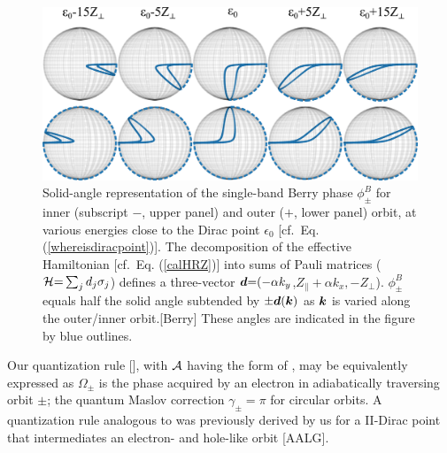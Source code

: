 \documentclass[aps, prb, showpacs, twocolumn, notitlepage, superscriptaddress]{revtex4-1}
\begin{document}
\begin{figure}
\includegraphics[width=1.0\columnwidth]{blochsphere.png}
\caption{Solid-angle representation of  the single-band Berry phase $\phi_{\pm}^B$ for inner (subscript $-$, upper panel) and outer ($+$, lower panel) orbit, at various energies close to the Dirac point $\epsilon_0$ [cf.\ Eq. (\ref{whereisdiracpoint})]. The decomposition of the effective Hamiltonian [cf.\ Eq. (\ref{calHRZ})] into sums of Pauli matrices (${\cal H}{=}\sum_jd_j\sigma_j$) defines a three-vector $\boldsymbol{d}{=}({-}\alpha k_y$,$Z_\parallel{+}\alpha k_x,{-}Z_\perp$).
 $\phi_{\pm}^B$  equals half the solid angle subtended by   ${\pm} \boldsymbol{d}(\boldsymbol{k})$ as $\boldsymbol{k}$ is varied along the outer/inner orbit.[Berry]   These angles are indicated in the figure by blue outlines.\label{fig:blochsphere}}
\end{figure}

Our quantization rule [], with ${\cal A}$ having the form of , may be equivalently expressed as
$\Omega_{\pm}$ is the phase acquired by an electron in adiabatically traversing orbit $\pm$; the quantum Maslov correction $\gamma_{\pm}{=}\pi$ for circular orbits.  A quantization rule analogous to  was previously derived by us for a II-Dirac point that intermediates an electron- and hole-like orbit [AALG]. 

\end{document}
